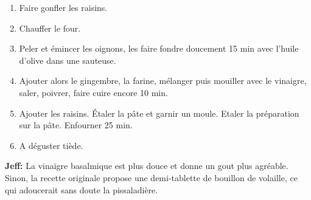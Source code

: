 
\begin{ingredients}
\end{ingredients}


\begin{recipe}
  \begin{enumerate}

  \item Faire gonfler les raisins.

  \item Chauffer le four.

  \item Peler et \'emincer les
    oignons, les faire fondre doucement 15 min avec l'huile d'olive dans
    une sauteuse.

  \item Ajouter alors le gingembre, la farine, m\'elanger puis
    mouiller avec le vinaigre, saler, poivrer, faire cuire encore 10 min.

  \item Ajouter les raisins.  \'Etaler la p\^ate et garnir un moule. Etaler la
    pr\'eparation sur la p\^ate.  Enfourner 25 min.

  \item A d\'eguster ti\`ede.

  \end{enumerate}

  \textbf{Jeff:} La vinaigre basalmique est plus douce et donne un
  gout plus agr\'eable.  Sinon, la recette originale propose une
  demi-tablette de bouillon de volaille, ce qui adoucerait sans doute
  la pissaladi\`ere.
\end{recipe}

